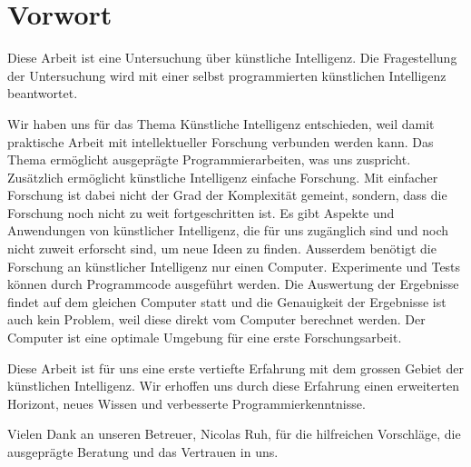 \section*{Vorwort}
Diese Arbeit ist eine Untersuchung über künstliche Intelligenz. Die
Fragestellung der Untersuchung wird mit einer selbst programmierten künstlichen
Intelligenz beantwortet. 

Wir haben uns für das Thema Künstliche Intelligenz entschieden, weil damit
praktische Arbeit mit intellektueller Forschung verbunden werden kann. Das Thema
ermöglicht ausgeprägte Programmierarbeiten, was uns zuspricht. Zusätzlich
ermöglicht künstliche Intelligenz einfache Forschung. Mit einfacher Forschung
ist dabei nicht der Grad der Komplexität gemeint, sondern, dass die Forschung
noch nicht zu weit fortgeschritten ist. Es gibt Aspekte und Anwendungen von
künstlicher Intelligenz, die für uns zugänglich sind und noch nicht zuweit
erforscht sind, um neue Ideen zu finden. Ausserdem benötigt die Forschung an
künstlicher Intelligenz nur einen Computer. Experimente und Tests können durch
Programmcode ausgeführt werden. Die Auswertung der Ergebnisse findet auf dem
gleichen Computer statt und die Genauigkeit der Ergebnisse ist auch kein
Problem, weil diese direkt vom Computer berechnet werden. Der Computer ist eine
optimale Umgebung für eine erste Forschungsarbeit.

Diese Arbeit ist für uns eine erste vertiefte Erfahrung mit dem grossen Gebiet
der künstlichen Intelligenz. Wir erhoffen uns durch diese Erfahrung einen
erweiterten Horizont, neues Wissen und verbesserte Programmierkenntnisse.

Vielen Dank an unseren Betreuer, Nicolas Ruh, für die hilfreichen Vorschläge,
die ausgeprägte Beratung und das Vertrauen in uns.

